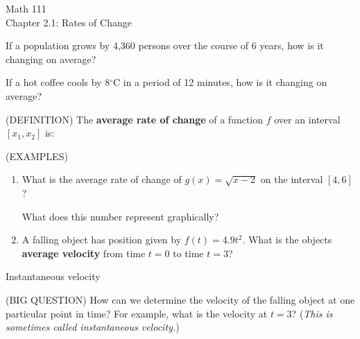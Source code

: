\documentclass[11pt]{article}
\begin{document}
\begin{center}
\Large
\rm{Math 111}
\\
\rm{Chapter 2.1:  Rates of Change}
\\
\end{center}
\vspace{0.2in}

If a population grows by 4,360 persons over the course of 6 years, how is it changing on average? \\

\vspace{0.2in}


If a hot coffee cools by 8$^{\circ}$C in a period of 12 minutes, how is it changing on average?  \\

\vspace{0.2in}

(DEFINITION)  The {\bf average rate of change} of a function $f$ over an interval $[x_1,x_2]$ is:

\vspace{1.5in}

(EXAMPLES)
\begin{enumerate}
  \item{
What is the average rate of change of $g(x) = \sqrt{x-2}$ on the interval $[4,6]$?\\

\vspace{.5in}

What does this number represent graphically?
}
\vspace{1.5in}





\item{A falling object has position given by $f(t)= 4.9t^2$.  What is the objects {\bf average velocity} from time $t=0$ to time $t=3$?

}
  \end{enumerate}

\pagebreak

\begin{center}
\Large
\rm{Instantaneous velocity}
\end{center}

(BIG QUESTION)  How can we determine the velocity of the falling object at one particular point in time?  For example, what is the velocity at $t=3$? 
(\emph{This is sometimes called instantaneous velocity.})


\vspace{0.2in}
\end{document}
